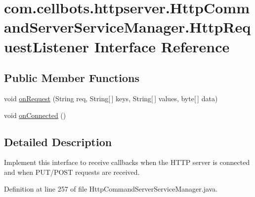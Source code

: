 \hypertarget{interfacecom_1_1cellbots_1_1httpserver_1_1_http_command_server_service_manager_1_1_http_request_listener}{\section{com.\-cellbots.\-httpserver.\-Http\-Command\-Server\-Service\-Manager.\-Http\-Request\-Listener Interface Reference}
\label{interfacecom_1_1cellbots_1_1httpserver_1_1_http_command_server_service_manager_1_1_http_request_listener}
}
\subsection*{Public Member Functions}
\begin{DoxyCompactItemize}
\item 
void \hyperlink{interfacecom_1_1cellbots_1_1httpserver_1_1_http_command_server_service_manager_1_1_http_request_listener_a4220771e039b12155f67aadd5ae497d2}{on\-Request} (String req, String\mbox{[}$\,$\mbox{]} keys, String\mbox{[}$\,$\mbox{]} values, byte\mbox{[}$\,$\mbox{]} data)
\item 
void \hyperlink{interfacecom_1_1cellbots_1_1httpserver_1_1_http_command_server_service_manager_1_1_http_request_listener_a82b0e2b83928d1287e5f68e90616e76d}{on\-Connected} ()
\end{DoxyCompactItemize}


\subsection{Detailed Description}
Implement this interface to receive callbacks when the H\-T\-T\-P server is connected and when P\-U\-T/\-P\-O\-S\-T requests are received. 

Definition at line 257 of file Http\-Command\-Server\-Service\-Manager.\-java.



